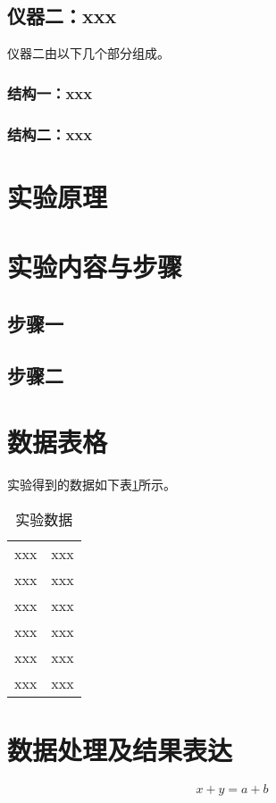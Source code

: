 \documentclass{Physics_Report}
\begin{document}
\subsection{仪器二：xxx}
仪器二由以下几个部分组成。
\subsubsection{结构一：xxx}

\subsubsection{结构二：xxx}

\section{实验原理}
\zhlipsum*[1]%
\section{实验内容与步骤}
\subsection{步骤一}
\zhlipsum*[2]%
\subsection{步骤二}
\zhlipsum*[3]%

\section{数据表格}
实验得到的数据如下表\ref{shuju}所示。
\begin{table}[htbp]
	\centering
	\caption{实验数据}
	\begin{tabular}{c|c}
		 \hline
		 \makebox[0.3\textwidth][c]{符号}	&  \makebox[0.4\textwidth][c]{测量结果} \\ \hline
		 xxx&xxx\\
		 xxx&xxx\\
		 xxx&xxx\\
		 xxx&xxx\\
		 xxx&xxx\\
		 xxx&xxx\\
		 \hline
	\end{tabular}
	\label{shuju}
\end{table}

\section{数据处理及结果表达}
\zhlipsum*[2-3]
$$ x+y = a + b$$
\end{document}
